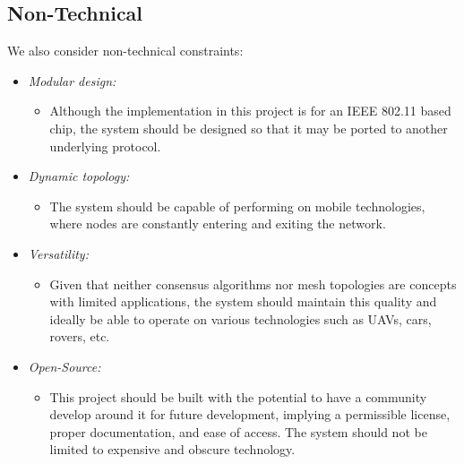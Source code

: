 \subsection{Non-Technical}

We also consider non-technical constraints:

\begin{itemize}
    \item \textit{Modular design:} 
    \begin{itemize}
        \item  Although the implementation in this project is for an IEEE 802.11 based chip, the system should be designed so that it may be ported to another underlying protocol.
    \end{itemize}
    
    
    \item \textit{Dynamic topology:}
    \begin{itemize}
        \item  The system should be capable of performing on mobile technologies, where nodes are constantly entering and exiting the network.
    \end{itemize}
    
    \item \textit{Versatility:}
    \begin{itemize}
        \item  Given that neither consensus algorithms nor mesh topologies are concepts with limited applications, the system should maintain this quality and ideally be able to operate on various technologies such as UAVs, cars, rovers, etc.
    \end{itemize}
    
    \item \textit{Open-Source:}
    \begin{itemize}
        \item  This project should be built with the potential to have a community develop around it for future development, implying a permissible license, proper documentation, and ease of access. The system should not be limited to expensive and obscure technology.
    \end{itemize}
\end{itemize}
 


